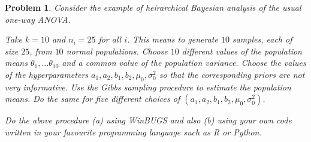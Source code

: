 \documentclass[12pt]{article}
\theoremstyle{problemstyle}
\newtheorem{pbm}{Problem}
\newenvironment{problem}{
\begin{tcolorbox}[colback=green!10!white,colframe=black!75!black, parbox = false]\begin{pbm} }{\end{pbm}\end{tcolorbox} }
\begin{document}
\begin{problem}
    Consider the example of heirarchical Bayesian analysis of the usual one-way ANOVA. 

    Take $k = 10$ and $n_i = 25$ for all $i$. This means to generate $10$ samples, each of size $25$, from $10$ normal populations. Choose $10$ different values of the population means $\theta_1, \dots \theta_{10}$ and a common value of the population variance. Choose the values of the hyperparameters $a_1, a_2, b_1, b_2, \mu_0, \sigma_0^2$ so that the corresponding priors are not very informative. Use the Gibbs sampling procedure to estimate the population means. Do the same for five different choices of $(a_1, a_2, b_1, b_2, \mu_0, \sigma_0^2)$.

    Do the above procedure (a) using WinBUGS and also (b) using your own code written in your favourite programming language such as R or Python.
\end{problem}
\end{document}
